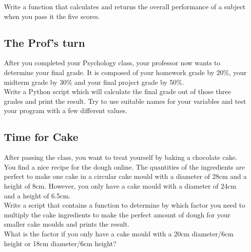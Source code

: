 Write a function that calculates and returns the overall performance of a subject when you pass it the five scores.
\cprotect{}

\subsection{The Prof's turn}
After you completed your Psychology class, your professor now wants to determine your final grade.
It is composed of your homework grade by 20\%, your midterm grade by 30\% and your final
project grade by 50\%.\\
Write a Python script which will calculate the final grade out of those three grades
and print the result. Try to use suitable names for your variables and test your program with
a few different values.

\cprotect{}

\subsection{Time for Cake}
After passing the class, you want to treat yourself by baking a chocolate cake.
You find a nice recipe for the dough online.
The quantities of the ingredients are perfect to make one cake in a circular cake mould with a diameter
of 28cm and a height of 8cm. However, you only have a cake mould with a diameter of 24cm and a height of 6.5cm.\\
Write a script that contains a function to determine by which factor you need to multiply the cake ingredients
to make the perfect amount of dough for your smaller cake moulds and prints the result.\\
What is the factor if you only have a cake mould with a 20cm diameter/6cm height or 18cm diameter/6cm height?

